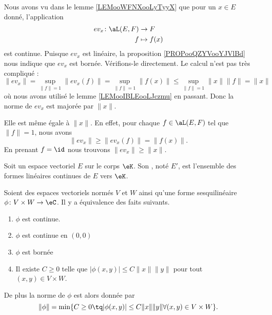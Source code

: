\begin{example}     \label{EXooTQPEooRRdddt}
	Nous avons vu dans le lemme \ref{LEMooWFNXooLyTyyX} que pour un \( x\in E\) donné, l'application
	\begin{equation}
		\begin{aligned}
			ev_x\colon \aL(E,F) & \to F        \\
			f                   & \mapsto f(x)
		\end{aligned}
	\end{equation}
	est continue. Puisque \( ev_x\) est linéaire, la proposition \ref{PROPooQZYVooYJVlBd} nous indique que \( ev_x\) est bornée. Vérifions-le directement. Le calcul n'est pas très compliqué :
	\begin{equation}
		\| ev_x \|=\sup_{\| f \|=1}\| ev_x(f) \|=\sup_{\| f \|=1}\| f(x) \|\leq \sup_{\| f \|=1}\| x \|\| f \|=\| x \|
	\end{equation}
	où nous avons utilisé le lemme \ref{LEMooIBLEooLJczmu} en passant. Donc la norme de \( ev_x\) est majorée par \( \| x \|\).

	Elle est même égale à \( \| x \|\). En effet, pour chaque \( f\in \aL(E,F)\) tel que \(  \| f \|=1\), nous avons
	\begin{equation}
		\| ev_x \|\geq \| ev_x(f) \|=\| f(x) \|.
	\end{equation}
	En prenant \( f=\id\) nous trouvons \(  \| ev_x \|\geq \| x \|  \).
\end{example}

\begin{definition}      \label{DEFooKSDFooGIBtrG}
	Soit un espace vectoriel \( E\) sur le corps \( \eK\). Son , noté \( E'\), est l'ensemble des formes linéaires continues de \( E\) vers \( \eK\).
\end{definition}

\begin{proposition}      \label{PROPooQFTSooPFfbCc}
	Soient des espaces vectoriels normés \( V\) et \( W\) ainsi qu'une forme sesquilinéaire \( \phi\colon V\times W\to \eC\). Il y a équivalence des faits suivants.
	\begin{enumerate}
		\item
		      \( \phi\) est continue.
		\item
		      \( \phi\) est continue en \( (0,0)\)
		\item
		      \( \phi\) est bornée
		\item
		      Il existe \( C\geq 0\) telle que \( | \phi(x,y) |\leq C\| x \|\| y \|  \) pour tout \( (x,y)\in V\times W\).
	\end{enumerate}
	De plus la norme de \( \phi\) est alors donnée par
	\begin{equation}
		\| \phi \|=\min\{  C\geq 0\tq | \phi(x,y) |\leq C\| x \|\| y \|\forall (x,y)\in V\times W  \}.
	\end{equation}
\end{proposition}

